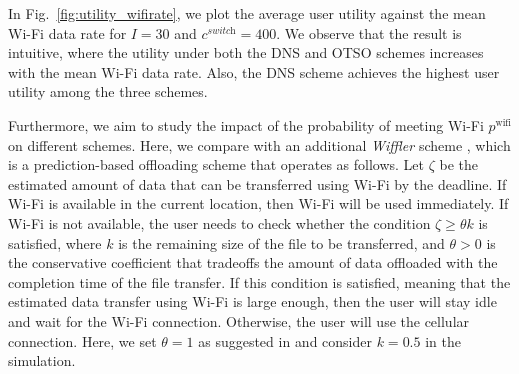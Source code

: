 \documentclass[journal]{IEEEtran}
\begin{document}
	
	In Fig.~\ref{fig:utility_wifirate}, we plot the average user utility against the mean Wi-Fi data rate for $I = 30$ and $c^{\textit{switch}} = 400$. We observe that the result is intuitive, where the utility under both the DNS and OTSO schemes increases with the mean Wi-Fi data rate. Also, the DNS scheme achieves the highest user utility among the three schemes.
	
	Furthermore, we aim to study the impact of the probability of meeting Wi-Fi $p^{\text{wifi}}$ on different schemes. Here, we compare with an additional \emph{Wiffler} scheme \cite{balasubramanian_am10}, which is a prediction-based offloading scheme that operates as follows. Let $\zeta$ be the estimated amount of data that can be transferred using Wi-Fi by the deadline. %
  If Wi-Fi is available in the current location, then Wi-Fi will be used immediately. If Wi-Fi is not available, the user needs to check whether the condition $\zeta \geq \theta k$ is satisfied, where $k$ is the remaining size of the file to be transferred, and $\theta > 0$ is the conservative coefficient that tradeoffs the amount of data offloaded with the completion time of the file transfer. If this condition is satisfied, meaning that the estimated data transfer using Wi-Fi is large enough, then the user will stay idle and wait for the Wi-Fi connection. Otherwise, the user will use the cellular connection. Here, we set $\theta = 1$ as suggested in \cite{balasubramanian_am10} and consider $k = 0.5$ in the simulation.
	
\end{document}
